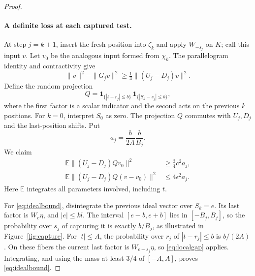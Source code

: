 \documentclass[11pt]{article}
\theoremstyle{definition}
\newcommand{\E}{\mathbb E}
\newcommand{\one}{\mathbf1}
\begin{document}
\begin{proof}
\paragraph{A definite loss at each captured test.}
At step $j=k+1$, insert the fresh position into $\zeta_k$ and apply
$W_{-s_j}$ on $K$; call this input $v$. Let $v_0$ be the analogous input
formed from $\chi_k$. The parallelogram identity and contractivity give
\begin{equation}\label{eq:normloss}
 \|v\|^2-\|G_jv\|^2\ge\tfrac14\|(U_j-D_j)v\|^2.
\end{equation}
Define the random projection
\[
 Q=\one_{\{|t-r_j|\le b\}}\,\one_{\{|S_k-s_j|\le b\}},
\]
where the first factor is a scalar indicator and the second acts on the
previous $k$ positions. For $k=0$, interpret $S_0$ as zero.
The projection $Q$ commutes with $U_j,D_j$ and the last-position shifts.
Put
\[
 a_j=\frac{b}{2A}\frac{b}{B_j}.
\]
We claim
\begin{align}
 \E\|(U_j-D_j)Qv_0\|^2&\ge\tfrac34c^2a_j,\label{eq:idealbound}\\
 \E\|(U_j-D_j)Q(v-v_0)\|^2&\le4\epsilon^2a_j.\label{eq:errorbound}
\end{align}
Here $\E$ integrates all parameters involved, including $t$.

For \eqref{eq:idealbound}, disintegrate the previous ideal vector over
$S_k=e$. Its last factor is $W_e\eta$, and $|e|\le kl$. The interval
$[e-b,e+b]$ lies in $[-B_j,B_j]$, so the probability over $s_j$ of capturing
it is exactly $b/B_j$, as illustrated in Figure~\ref{fig:capture}.
For $|t|\le A$, the probability over $r_j$ of
$|t-r_j|\le b$ is $b/(2A)$. On these fibers the current last factor is
$W_{e-s_j}\eta$, so \eqref{eq:localgap} applies. Integrating, and using the
mass at least $3/4$ of $[-A,A]$, proves \eqref{eq:idealbound}.


\end{proof}
\end{document}
